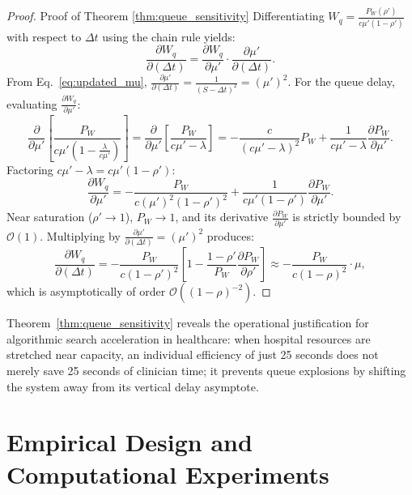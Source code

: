 \documentclass[ijds,dblanonrev]{informs4}
\begin{document}
\begin{proof}{Proof of Theorem \ref{thm:queue_sensitivity}}
Differentiating $W_q = \frac{P_W(\rho')}{c \mu' (1 - \rho')}$ with respect to $\Delta t$ using the chain rule yields:
\begin{equation}
  \frac{\partial W_q}{\partial (\Delta t)} = \frac{\partial W_q}{\partial \mu'} \cdot \frac{\partial \mu'}{\partial (\Delta t)}.
\end{equation}
From Eq.~\eqref{eq:updated_mu}, $\frac{\partial \mu'}{\partial (\Delta t)} = \frac{1}{(S - \Delta t)^2} = (\mu')^2$. For the queue delay, evaluating $\frac{\partial W_q}{\partial \mu'}$:
\begin{equation}
  \frac{\partial}{\partial \mu'} \left[ \frac{P_W}{c \mu' (1 - \frac{\lambda}{c \mu'})} \right] = \frac{\partial}{\partial \mu'} \left[ \frac{P_W}{c \mu' - \lambda} \right] = -\frac{c}{(c \mu' - \lambda)^2} P_W + \frac{1}{c \mu' - \lambda} \frac{\partial P_W}{\partial \mu'}.
\end{equation}
Factoring $c \mu' - \lambda = c \mu' (1 - \rho')$:
\begin{equation}
  \frac{\partial W_q}{\partial \mu'} = -\frac{P_W}{c (\mu')^2 (1 - \rho')^2} + \frac{1}{c \mu' (1 - \rho')} \frac{\partial P_W}{\partial \mu'}.
\end{equation}
Near saturation ($\rho' \to 1$), $P_W \to 1$, and its derivative $\frac{\partial P_W}{\partial \mu'}$ is strictly bounded by $\mathcal{O}(1)$. Multiplying by $\frac{\partial \mu'}{\partial (\Delta t)} = (\mu')^2$ produces:
\begin{equation}
  \frac{\partial W_q}{\partial (\Delta t)} = -\frac{P_W}{c (1 - \rho')^2} \left[ 1 - \frac{1 - \rho'}{P_W} \frac{\partial P_W}{\partial \rho'} \right] \approx -\frac{P_W}{c (1 - \rho)^2} \cdot \mu,
\end{equation}
which is asymptotically of order $\mathcal{O}((1-\rho)^{-2})$.\Halmos
\end{proof}

Theorem~\ref{thm:queue_sensitivity} reveals the operational justification for algorithmic search acceleration in healthcare: when hospital resources are stretched near capacity, an individual efficiency of just 25 seconds does not merely save 25 seconds of clinician time; it prevents queue explosions by shifting the system away from its vertical delay asymptote.

\section{Empirical Design and Computational Experiments}
\label{sec:experiments}
\end{document}
